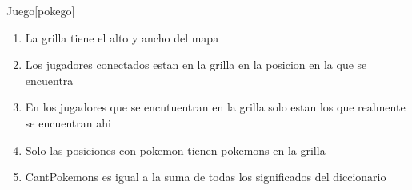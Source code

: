 \begin{Representacion}


	\begin{Estructura}{Juego}[pokego]
		\begin{Tupla}[pokego]
		\end{Tupla}

		\begin{Tupla}[infoJugador]
		\end{Tupla}

		\begin{Tupla}[infoPos]
		\end{Tupla}

	\end{Estructura}
	

	\begin{enumerate}

		\item La grilla tiene el alto y ancho del mapa 

		\item Los jugadores conectados estan en la grilla en la posicion en la que se encuentra 

		\item En los jugadores que se encutuentran en la grilla solo estan los que realmente se encuentran ahi 

		\item Solo las posiciones con pokemon tienen pokemons en la grilla

		\item CantPokemons es igual a la suma de todas los significados del diccionario 


\end{enumerate}
\end{Representacion}
